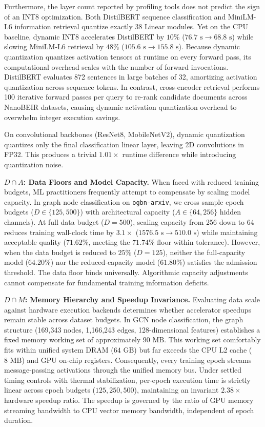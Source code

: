 \documentclass[10pt,twocolumn]{article}
\begin{document}
Furthermore, the layer count reported by profiling tools does not predict the sign of an INT8 optimization. Both DistilBERT sequence classification and MiniLM-L6 information retrieval quantize exactly 38 Linear modules. Yet on the CPU baseline, dynamic INT8 accelerates DistilBERT by $10\%$ ($76.7\text{ s} \to 68.8\text{ s}$) while slowing MiniLM-L6 retrieval by \textbf{$48\%$} ($105.6\text{ s} \to 155.8\text{ s}$). Because dynamic quantization quantizes activation tensors at runtime on every forward pass, its computational overhead scales with the number of forward invocations. DistilBERT evaluates 872 sentences in large batches of 32, amortizing activation quantization across sequence tokens. In contrast, cross-encoder retrieval performs 100 iterative forward passes per query to re-rank candidate documents across NanoBEIR datasets, causing dynamic activation quantization overhead to overwhelm integer execution savings. 

On convolutional backbones (ResNet8, MobileNetV2), dynamic quantization quantizes only the final classification linear layer, leaving 2D convolutions in FP32. This produces a trivial $1.01\times$ runtime difference while introducing quantization noise.

\textbf{$D \cap A$: Data Floors and Model Capacity.}
When faced with reduced training budgets, ML practitioners frequently attempt to compensate by scaling model capacity. In graph node classification on \texttt{ogbn-arxiv}, we cross sample epoch budgets ($D \in \{125, 500\}$) with architectural capacity ($A \in \{64, 256\}$ hidden channels). At full data budget ($D=500$), scaling capacity from 256 down to 64 reduces training wall-clock time by $3.1\times$ ($1576.5\text{ s} \to 510.0\text{ s}$) while maintaining acceptable quality ($71.62\%$, meeting the $71.74\%$ floor within tolerance). However, when the data budget is reduced to $25\%$ ($D=125$), neither the full-capacity model ($64.20\%$) nor the reduced-capacity model ($61.80\%$) satisfies the admission threshold. The data floor binds universally. Algorithmic capacity adjustments cannot compensate for fundamental training information deficits.

\textbf{$D \cap M$: Memory Hierarchy and Speedup Invariance.}
Evaluating data scale against hardware execution backends determines whether accelerator speedups remain stable across dataset budgets. In GCN node classification, the graph structure (169,343 nodes, 1,166,243 edges, 128-dimensional features) establishes a fixed memory working set of approximately $90\text{ MB}$. This working set comfortably fits within unified system DRAM ($64\text{ GB}$) but far exceeds the CPU L2 cache ($8\text{ MB}$) and GPU on-chip registers. Consequently, every training epoch streams message-passing activations through the unified memory bus. Under settled timing controls with thermal stabilization, per-epoch execution time is strictly linear across epoch budgets ($125, 250, 500$), maintaining an invariant $2.38\times$ hardware speedup ratio. The speedup is governed by the ratio of GPU memory streaming bandwidth to CPU vector memory bandwidth, independent of epoch duration.
\end{document}
